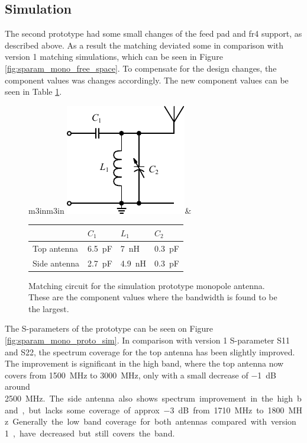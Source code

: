 \FloatBarrier
\subsection{Simulation}
The second prototype had some small changes of the feed pad and fr4 support, as described above. As a result the matching deviated some in comparison with version 1 matching simulations, which can be seen in Figure \ref{fig:sparam_mono_free_space}. To compensate for the design changes, the component values was changes accordingly. The new component values can be seen in Table \ref{fig:mono_proto_sim_matching}.

\begin{figure}[htbp]
        \centering
        \begin{tabular}{m{3in}m{3in}}
            \centering
            \includegraphics{img/tech_sol/schematic_tuning_1}&
            \centering
            \footnotesize
            \begin{tabular}{|l|l|l|l|}
                \hline
                & $C_1$ & $L_1$ & $C_2$ \\
                \hline
                Top antenna & \SI{6.5}{pF} & \SI{7}{nH} & \SI{0.3}{pF} \\
                Side antenna & \SI{2.7}{pF} & \SI{4.9}{nH} & \SI{0.3}{pF} \\
                \hline
            \end{tabular}
        \end{tabular}
    \caption{Matching circuit for the simulation prototype monopole antenna. These are the component values where the bandwidth is found to be the largest.}
    \label{fig:mono_proto_sim_matching}
\end{figure}


The S-parameters of the prototype can be seen on Figure \ref{fig:sparam_mono_proto_sim}. In comparison with version 1 S-parameter S11 and S22, the spectrum coverage for the top antenna has been slightly improved. The improvement is significant in the high band, where the top antenna now covers from \SI{1500}{MHz} to \SI{3000}{MHz}, only with a small decrease of \SI{-1}{dB} around \SI{2500}{MHz.}. The side antenna also shows spectrum improvement in the high band, but lacks some coverage of approx \SI{-3}{dB} from \SI{1710}{MHz} to \SI{1800}{MHz}. Generally the low band coverage for both antennas compared with version 1, have decreased but still covers the band.

